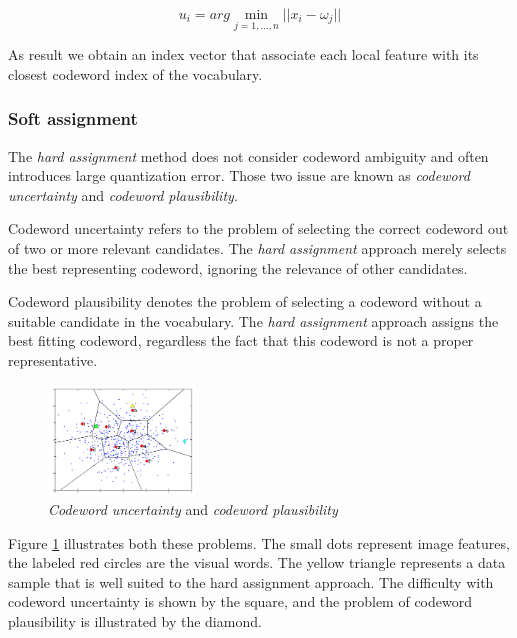$$u_i = arg \min_{j = 1, \ldots, n} ||x_i - \omega_j||$$

As result we obtain an index vector that associate each local feature with its closest codeword index of the vocabulary.

\subsubsection{Soft assignment}

The \emph{hard assignment} method does not consider codeword ambiguity and often introduces large quantization error. Those two issue are known as \emph{codeword uncertainty} and \emph{codeword plausibility}. 

Codeword uncertainty refers to the problem of selecting the correct codeword out of two or more relevant candidates. The \emph{hard assignment} approach merely selects the best representing codeword, ignoring the relevance of other candidates. 

Codeword plausibility denotes the problem of selecting a codeword without a suitable candidate in the vocabulary. The \emph{hard assignment} approach assigns the best fitting codeword, regardless the fact that this codeword is not a proper representative. 

\begin{figure}[h]
\begin{center}
\includegraphics[width=0.35\textwidth]{images/soft-assignment.jpg}
\end{center}
  \caption{\emph{Codeword uncertainty} and \emph{codeword plausibility}}
\label{fig:softAssignment}
\end{figure}

Figure \ref{fig:softAssignment} illustrates both these problems. The small dots represent image features, the labeled red circles are the visual words. The yellow triangle represents a data sample that is well suited to the hard assignment approach. The difficulty with codeword uncertainty is shown by the square, and the problem of codeword plausibility is illustrated by the diamond.





